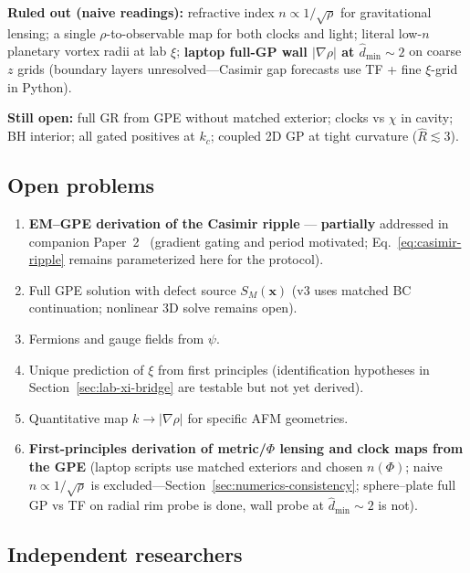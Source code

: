\documentclass[11pt,a4paper]{article}
\begin{document}
\noindent\textbf{Ruled out (naive readings):} refractive index $n \propto 1/\sqrt{\rho}$ for gravitational lensing; a single $\rho$-to-observable map for both clocks and light; literal low-$n$ planetary vortex radii at lab $\xi$; \textbf{laptop full-GP wall $|\nabla\rho|$ at $\hat{d}_{\min}\sim 2$} on coarse $z$ grids (boundary layers unresolved---Casimir gap forecasts use TF + fine $\xi$-grid in Python).

\noindent\textbf{Still open:} full GR from GPE without matched exterior; clocks vs $\chi$ in cavity; BH interior; all gated positives at $k_c$; coupled 2D GP at tight curvature ($\hat{R}\lesssim 3$).
\FloatBarrier

\subsection{Open problems}
\label{sec:open-problems}

\begin{enumerate}[label=\arabic*., leftmargin=*]
  \item \textbf{EM--GPE derivation of the Casimir ripple} --- \textbf{partially} addressed in companion Paper~2~\cite{CHPaper2} (gradient gating and period motivated; Eq.~\ref{eq:casimir-ripple} remains parameterized here for the protocol).
  \item Full GPE solution with defect source $S_M(\mathbf{x})$ (v3 uses matched BC continuation; nonlinear 3D solve remains open).
  \item Fermions and gauge fields from $\psi$.
  \item Unique prediction of $\xi$ from first principles (identification hypotheses in Section~\ref{sec:lab-xi-bridge} are testable but not yet derived).
  \item Quantitative map $k \to |\nabla\rho|$ for specific AFM geometries.
  \item \textbf{First-principles derivation of metric/$\Phi$ lensing and clock maps from the GPE} (laptop scripts use matched exteriors and chosen $n(\Phi)$; naive $n \propto 1/\sqrt{\rho}$ is excluded---Section~\ref{sec:numerics-consistency}; sphere--plate full GP vs TF on radial rim probe is done, wall probe at $\hat{d}_{\min}\sim 2$ is not).
\end{enumerate}

\subsection{Independent researchers}
\end{document}
